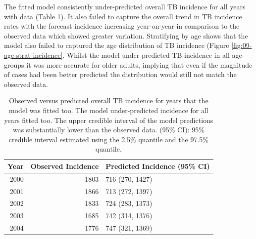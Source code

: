 \documentclass[11pt,twoside]{bristolthesis}
\begin{document}
  The fitted model consistently under-predicted overall TB incidence for all years with data (Table \ref{tab:09-table-incidence-preds}). It also failed to capture the overall trend in TB incidence rates with the forecast incidence increasing year-on-year in comparison to the observed data which showed greater variation. Stratifying by age shows that the model also failed to captured the age distribution of TB incidence (Figure \ref{fig:09-age-strat-incidence}. Whilst the model under predicted TB incidence in all age-groups it was more accurate for older adults, implying that even if the magnitude of cases had been better predicted the distribution would still not match the observed data.
  \begin{longtable}{rrl}
  \caption[Observed versus predicted overall TB incidence for years that the model was fitted too.]{\label{tab:09-table-incidence-preds}Observed versus predicted overall TB incidence for years that the model was fitted too. The model under-predicted incidence for all years fitted too. The upper credible interval of the model predictions was substantially lower than the observed data. (95\% CI): 95\% credible interval estimated using the 2.5\% quantile and the 97.5\% quantile.}\\
  \toprule
  Year & Observed Incidence & Predicted Incidence (95\% CI)\\
  \midrule
  2000 & 1803 & 716 (270, 1427)\\
  2001 & 1866 & 713 (272, 1397)\\
  2002 & 1833 & 724 (283, 1373)\\
  2003 & 1685 & 742 (314, 1376)\\
  2004 & 1776 & 747 (321, 1369)\\
  \bottomrule
  \end{longtable}
\end{document}
